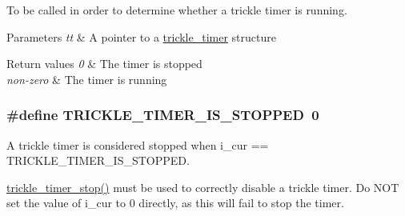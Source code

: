 To be called in order to determine whether a trickle timer is running. 


\begin{DoxyParams}{Parameters}
{\em tt} & A pointer to a \hyperlink{structtrickle__timer}{trickle\+\_\+timer} structure \\
\hline
\end{DoxyParams}

\begin{DoxyRetVals}{Return values}
{\em 0} & The timer is stopped \\
\hline
{\em non-\/zero} & The timer is running \\
\hline
\end{DoxyRetVals}
\hypertarget{group__trickle-timer_ga46a9d1ac6e07dc96cfd6224b873333ca}{}
\subsubsection[{T\+R\+I\+C\+K\+L\+E\+\_\+\+T\+I\+M\+E\+R\+\_\+\+I\+S\+\_\+\+S\+T\+O\+P\+P\+E\+D}]{\setlength{\rightskip}{0pt plus 5cm}\#define T\+R\+I\+C\+K\+L\+E\+\_\+\+T\+I\+M\+E\+R\+\_\+\+I\+S\+\_\+\+S\+T\+O\+P\+P\+E\+D~0}\label{group__trickle-timer_ga46a9d1ac6e07dc96cfd6224b873333ca}


A trickle timer is considered \textquotesingle{}stopped\textquotesingle{} when i\+\_\+cur == T\+R\+I\+C\+K\+L\+E\+\_\+\+T\+I\+M\+E\+R\+\_\+\+I\+S\+\_\+\+S\+T\+O\+P\+P\+E\+D. 

\hyperlink{group__trickle-timer_gaa475b1b9b3edd81df04d290bd34d7e72}{trickle\+\_\+timer\+\_\+stop()} must be used to correctly disable a trickle timer. Do N\+O\+T set the value of i\+\_\+cur to 0 directly, as this will fail to stop the timer. \hypertarget{group__trickle-timer_ga157285503882e567c275871fd30d3016}{}
